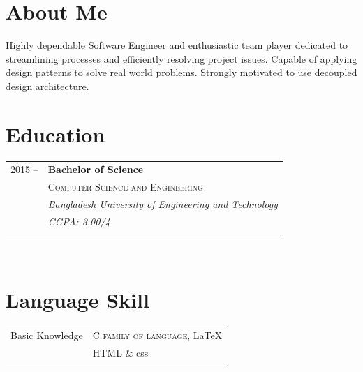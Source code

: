 \documentclass[10pt]{article} %
\begin{document}
{\begin{minipage}[t]{0.44\textwidth}
\section{About Me}
\normalsize{Highly dependable Software Engineer and enthusiastic team player dedicated to streamlining processes and efficiently resolving project issues. Capable of applying design patterns to solve real world problems. Strongly motivated to use decoupled design architecture.}\\

\section{Education} 

\begin{tabular}{rl} %


2015 --  & \textbf{Bachelor of Science} \\ 
& \textsc{Computer Science and Engineering} \\ 
& \textit{Bangladesh University of Engineering and Technology}\\
& \textit{CGPA: 3.00/4}\\
&\\
	 


\end{tabular}\\[10pt]


\section{Language Skill} 

\begin{tabular}{rl}
Basic Knowledge
& \textsc{C family of language}, \LaTeX\\ 
&HTML \& css\\
& \\


\end{tabular}
\end{minipage}}
\end{document}
